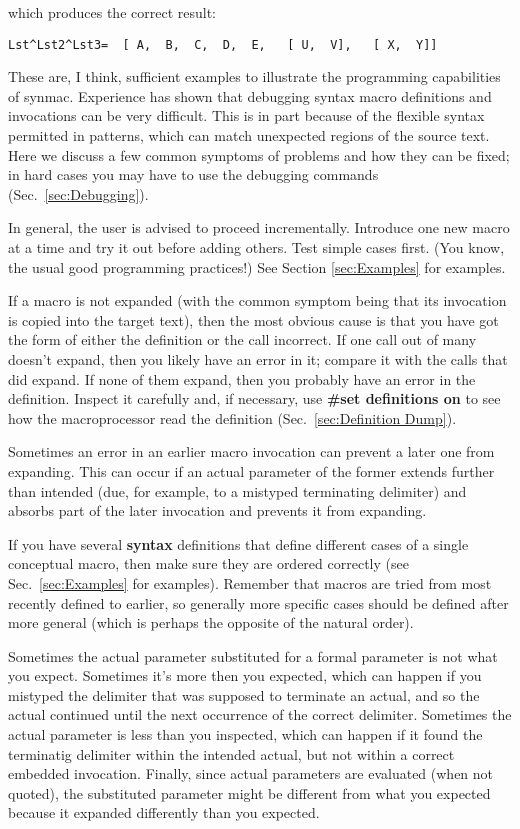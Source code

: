 \documentclass[12pt]{article}
\begin{document}
which produces the correct result:
\begin{lstlisting}[frame=single]
Lst^Lst2^Lst3=  [ A,  B,  C,  D,  E,   [ U,  V],   [ X,  Y]]
\end{lstlisting}
These are, I think, sufficient examples to illustrate the programming capabilities of synmac.
Experience has shown that debugging syntax macro definitions and invocations can be very difficult.
This is in part because of the flexible syntax permitted in patterns, which can match unexpected regions of the source text.
Here we discuss a few common symptoms of problems and how they can be fixed;
in hard cases you may have to use the debugging commands (Sec.\ \ref{sec:Debugging}).

In general, the user is advised to proceed incrementally.
Introduce one new macro at a time and try it out before adding others.
Test simple cases first.
(You know, the usual good programming practices!)
See Section \ref{sec:Examples} for examples.

If a macro is not expanded (with the common symptom being that its invocation is copied into the target text), then the most obvious cause is that you have got the form of either the definition or the call incorrect.
If one call out of many doesn't expand, then you likely have an error in it; compare it with the calls that did expand.
If none of them expand, then you probably have an error in the definition.
Inspect it carefully and, if necessary, use \textbf{\#set definitions on} to see how the macroprocessor read the definition (Sec.\ \ref{sec:Definition Dump}).

Sometimes an error in an earlier macro invocation  can prevent a later one from expanding. 
This can occur if an actual parameter of the former extends further than intended (due, for example, to a mistyped terminating delimiter) and absorbs part of the later invocation and prevents it from expanding.

If you have several \textbf{syntax} definitions that define different cases of a single conceptual macro, then make sure they are ordered correctly (see Sec.\ \ref{sec:Examples} for examples).
Remember that macros are tried from most recently defined to earlier, so generally more specific cases should be defined after more general (which is perhaps the opposite of the natural order).

Sometimes the actual parameter substituted for a formal parameter is not what you expect.
Sometimes it's more then you expected, which can happen if you mistyped the delimiter that was supposed to terminate an actual, and so the actual continued until the next occurrence of the correct delimiter.
Sometimes the actual parameter is less than you inspected, which can happen if it found the terminatig delimiter within the intended actual, but not within a correct embedded invocation.
Finally, since actual parameters are evaluated (when not quoted), the substituted parameter might be different from what you expected because it expanded differently than you expected.
\end{document}

